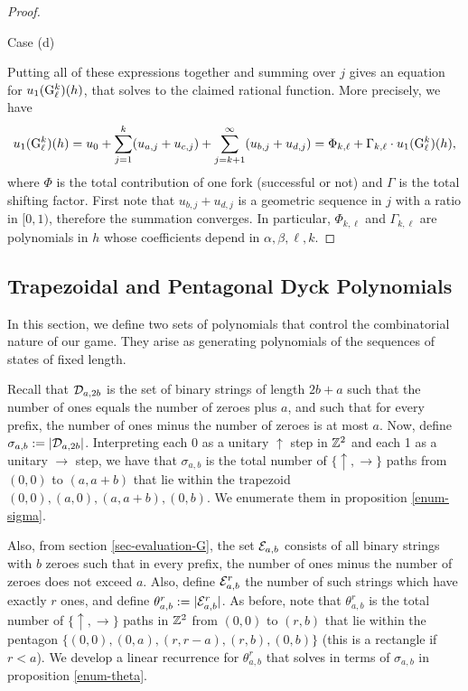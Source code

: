 \begin{proof}
\begin{subsubsection}{Case (d)}
\end{subsubsection}

Putting all of these expressions together and summing over $j$ gives an equation for $u_1({\rm {G}}^k_\ell)(h)$, that solves to the claimed rational function. More precisely, we have
$$u_1({\rm {G}}^k_\ell)(h) = u_0 + \sum_{j=1}^k (u_{a,j} + u_{c,j}) + \sum_{j=k+1}^\infty (u_{b,j} + u_{d,j}) = \Phi_{k,\ell} + \Gamma_{k,\ell}\cdot u_1({\rm {G}}^k_\ell)(h),$$
where $\Phi$ is the total contribution of one fork (successful or not) and $\Gamma$ is the total shifting factor. First note that $u_{b,j}+u_{d,j}$ is a geometric sequence in $j$ with a ratio in $[0,1)$, therefore the summation converges. In particular, $\Phi_{k,\ell}$ and $\Gamma_{k,\ell}$ are polynomials in $h$ whose coefficients depend in $\alpha,\beta,\ell,k$.
\end{proof}

\subsection{Trapezoidal and Pentagonal Dyck Polynomials}
\label{sec-trapezoid-pentagon}

In this section, we define two sets of polynomials that control the combinatorial nature of our game. They arise as generating polynomials of the sequences of states of fixed length. 

Recall that $\mathcal{D}_{a,2b}$ is the set of binary strings of length $2b+a$ such that the number of ones equals the number of zeroes plus $a$, and such that for every prefix, the number of ones minus the number of zeroes is at most $a$. Now, define $\sigma_{a,b}:=|\mathcal{D}_{a,2b}|$. Interpreting each 0 as a unitary $\uparrow$ step in $\mathbb{Z}^2$ and each 1 as a unitary $\rightarrow$ step, we have that $\sigma_{a,b}$ is the total number of $\{\uparrow,\rightarrow\}$ paths from $(0,0)$ to $(a,a+b)$ that lie within the trapezoid ${(0,0),(a,0),(a,a+b),(0,b)}$. We enumerate them in proposition \ref{enum-sigma}.

Also, from section \ref{sec-evaluation-G}, the set $\mathcal{E}_{a,b}$ consists of all binary strings with $b$ zeroes such that in every prefix, the number of ones minus the number of zeroes does not exceed $a$. Also, define $\mathcal{E}_{a,b}^r$ the number of such strings which have exactly $r$ ones, and define $\theta_{a,b}^r:= |\mathcal{E}_{a,b}^r|$. As before, note that $\theta_{a,b}^r$ is the total number of $\{\uparrow,\rightarrow\}$ paths in $\mathbb{Z}^2$ from $(0,0)$ to $(r,b)$ that lie within the pentagon $\{(0,0),(0,a),(r,r-a), (r,b), (0,b)\}$ (this is a rectangle if $r<a$). We develop a linear recurrence for $\theta_{a,b}^r$ that solves in terms of $\sigma_{a,b}$ in proposition \ref{enum-theta}. 

